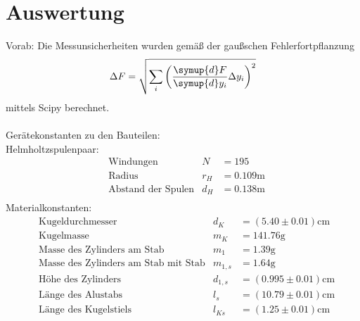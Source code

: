 \section{Auswertung}
\label{sec:Auswertung}
Vorab: Die Messunsicherheiten wurden gemäß der gaußschen Fehlerfortpflanzung
\begin{equation*}
  \label{eqn:Gauss}
  \Delta F = \sqrt{\sum_i\left(\frac{\symup{d}F}{\symup{d}y_i}\Delta y_i \right)^2}
\end{equation*}
mittels Scipy \cite{scipy}  berechnet.\\
\\
Gerätekonstanten zu den Bauteilen:\\
Helmholtzspulenpaar:
\begin{align*}
    &\text{Windungen}& N &= 195 \\
    &\text{Radius}& r_H &= 0.109 \unit{\metre} \\
    &\text{Abstand der Spulen}& d_H &= 0.138 \unit{\metre} \\
\end{align*}
Materialkonstanten:
\begin{align*}
    &\text{Kugeldurchmesser}& d_K &= (5.40 \pm 0.01) \unit{\centi\metre} \\
    &\text{Kugelmasse}& m_K &=  141.76  \unit{\gram} \\
    &\text{Masse des Zylinders am Stab}& m_1 &=  1.39  \unit{\gram} \\
    &\text{Masse des Zylinders am Stab mit Stab}& m_{1,s} &= 1.64 \unit{\gram} \\
    &\text{Höhe des Zylinders}& d_{1,s} &= (0.995 \pm 0.01) \unit{\centi\metre} \\
    &\text{Länge des Alustabs}& l_s &= (10.79 \pm 0.01) \unit{\centi\metre} \\
    &\text{Länge des Kugelstiels}& l_{Ks} &= (1.25 \pm 0.01) \unit{\centi\metre} \\
\end{align*}

